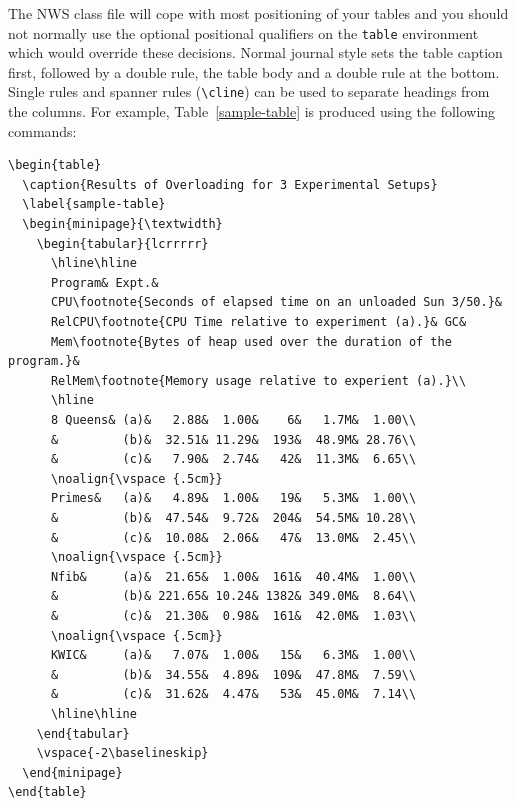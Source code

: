 \documentclass{article}
\begin{document}
The NWS class file will cope with most positioning of your tables
and you should not normally use the optional positional qualifiers on the
\verb"table" environment which would override these decisions.
Normal journal style sets the table caption first, followed by a double
rule, the table body and a double rule at the bottom. Single rules and
spanner rules (\verb"\cline") can be used to separate headings from the
columns. For example, Table~\ref{sample-table} is produced using the
following commands:\par
%
{\small
\begin{verbatim}
\begin{table}
  \caption{Results of Overloading for 3 Experimental Setups}
  \label{sample-table}
  \begin{minipage}{\textwidth}
    \begin{tabular}{lcrrrrr}
      \hline\hline
      Program& Expt.&
      CPU\footnote{Seconds of elapsed time on an unloaded Sun 3/50.}&
      RelCPU\footnote{CPU Time relative to experiment (a).}& GC&
      Mem\footnote{Bytes of heap used over the duration of the program.}&
      RelMem\footnote{Memory usage relative to experient (a).}\\
      \hline
      8 Queens& (a)&   2.88&  1.00&    6&   1.7M&  1.00\\
      &         (b)&  32.51& 11.29&  193&  48.9M& 28.76\\
      &         (c)&   7.90&  2.74&   42&  11.3M&  6.65\\
      \noalign{\vspace {.5cm}}
      Primes&   (a)&   4.89&  1.00&   19&   5.3M&  1.00\\
      &         (b)&  47.54&  9.72&  204&  54.5M& 10.28\\
      &         (c)&  10.08&  2.06&   47&  13.0M&  2.45\\
      \noalign{\vspace {.5cm}}
      Nfib&     (a)&  21.65&  1.00&  161&  40.4M&  1.00\\
      &         (b)& 221.65& 10.24& 1382& 349.0M&  8.64\\
      &         (c)&  21.30&  0.98&  161&  42.0M&  1.03\\
      \noalign{\vspace {.5cm}}
      KWIC&     (a)&   7.07&  1.00&   15&   6.3M&  1.00\\
      &         (b)&  34.55&  4.89&  109&  47.8M&  7.59\\
      &         (c)&  31.62&  4.47&   53&  45.0M&  7.14\\
      \hline\hline
    \end{tabular}
    \vspace{-2\baselineskip}
  \end{minipage}
\end{table}
\end{verbatim}}
\end{document}
